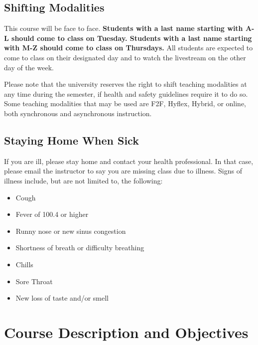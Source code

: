 \documentclass[11pt,]{article}
\providecommand{\tightlist}{%
  \setlength{\itemsep}{0pt}\setlength{\parskip}{0pt}}
\begin{document}
\hypertarget{shifting-modalities}{%
\subsection{Shifting Modalities}\label{shifting-modalities}}

This course will be face to face. \textbf{Students with a last name starting with A-L should come to class on Tuesday. Students with a last name starting with M-Z should come to class on Thursdays.} All students are expected to come to class on their designated day and to watch the livestream on the other day of the week.

Please note that the university reserves the right to shift teaching modalities at any time during the semester, if
health and safety guidelines require it to do so. Some teaching modalities that may be used are
F2F, Hyflex, Hybrid, or online, both synchronous and asynchronous instruction.

\hypertarget{staying-home-when-sick}{%
\subsection{Staying Home When Sick}\label{staying-home-when-sick}}

If you are ill, please stay home and contact your health professional. In that case, please email the instructor to
say you are missing class due to illness. Signs of illness include, but are not limited to, the following:

\begin{itemize}
\tightlist
\item
  Cough
\item
  Fever of 100.4 or higher
\item
  Runny nose or new sinus congestion
\item
  Shortness of breath or difficulty
  breathing
\item
  Chills
\item
  Sore Throat
\item
  New loss of taste and/or smell
\end{itemize}

\hypertarget{course-description-and-objectives}{%
\section*{Course Description and Objectives}\label{course-description-and-objectives}}
\end{document}
